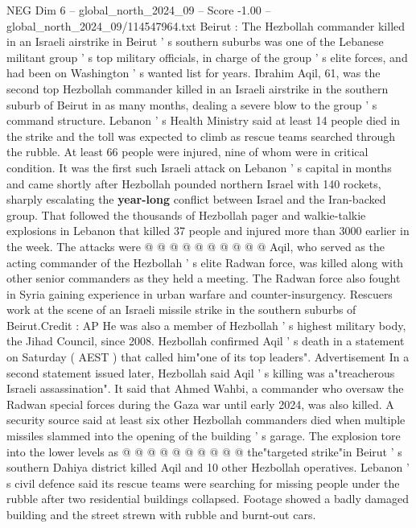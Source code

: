 \begin{textsample}{NEG Dim 6 – global\_north\_2024\_09 – Score -1.00 – global\_north\_2024\_09/114547964.txt}  \label{ex:f6_neg_023}
Beirut : The Hezbollah commander killed in an Israeli airstrike in Beirut ' s southern suburbs was one of the Lebanese militant group ' s top military officials, in charge of the group ' s elite forces, and had been on Washington ' s wanted list for years.
Ibrahim Aqil, 61, was the second top Hezbollah commander killed in an Israeli airstrike in the southern suburb of Beirut in as many months, dealing a severe blow to the group ' s command structure.
Lebanon ' s Health Ministry said at least 14 people died in the strike and the toll was expected to climb as rescue teams searched through the rubble.
At least 66 people were injured, nine of whom were in critical condition.
It was the first such Israeli attack on Lebanon ' s capital in months and came shortly after Hezbollah pounded northern Israel with 140 rockets, sharply escalating the \textbf{year-long} conflict between Israel and the Iran-backed group.
That followed the thousands of Hezbollah pager and walkie-talkie explosions in Lebanon that killed 37 people and injured more than 3000 earlier in the week.
The attacks were @ @ @ @ @ @ @ @ @ @ Aqil, who served as the acting commander of the Hezbollah ' s elite Radwan force, was killed along with other senior commanders as they held a meeting.
The Radwan force also fought in Syria gaining experience in urban warfare and counter-insurgency.
Rescuers work at the scene of an Israeli missile strike in the southern suburbs of Beirut.Credit : AP He was also a member of Hezbollah ' s highest military body, the Jihad Council, since 2008.
Hezbollah confirmed Aqil ' s death in a statement on Saturday ( AEST ) that called him"one of its top leaders".
Advertisement In a second statement issued later, Hezbollah said Aqil ' s killing was a"treacherous Israeli assassination".
It said that Ahmed Wahbi, a commander who oversaw the Radwan special forces during the Gaza war until early 2024, was also killed.
A security source said at least six other Hezbollah commanders died when multiple missiles slammed into the opening of the building ' s garage.
The explosion tore into the lower levels as @ @ @ @ @ @ @ @ @ @ the"targeted strike"in Beirut ' s southern Dahiya district killed Aqil and 10 other Hezbollah operatives.
Lebanon ' s civil defence said its rescue teams were searching for missing people under the rubble after two residential buildings collapsed.
Footage showed a badly damaged building and the street strewn with rubble and burnt-out cars.

\end{textsample}
